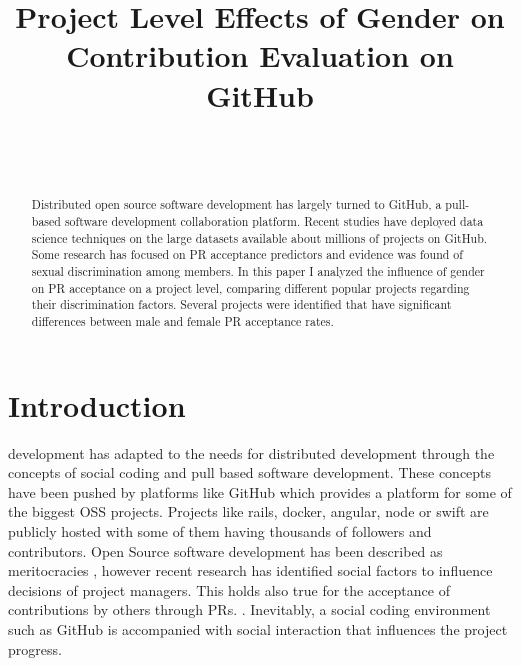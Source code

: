 


\title{Project Level Effects of Gender on Contribution Evaluation on GitHub}

\author{
    \\
    \\
    }

\maketitle

\begin{abstract}%

Distributed open source software development has largely turned to GitHub, a pull-based software development collaboration platform. Recent studies have deployed data science techniques on the large datasets available about millions of projects on GitHub. Some research has focused on \ac{PR} acceptance predictors and evidence was found of sexual discrimination among members. In this paper I analyzed the influence of gender on \ac{PR} acceptance on a project level, comparing different popular projects regarding their discrimination factors. Several projects were identified that have significant differences between male and female \ac{PR} acceptance rates.
\end{abstract}


\section{Introduction}\label{Introduction}

 development has adapted to the needs for distributed development through the concepts of social coding and pull based software development. These concepts have been pushed by platforms like GitHub which provides a platform for some of the biggest \ac{OSS} projects. Projects like rails, docker, angular, node or swift are publicly hosted with some of them having thousands of followers and contributors. Open Source software development has been described as meritocracies \cite{Scacchi:2007:FSS:1295014.1295019}, however recent research has identified social factors to influence decisions of project managers. This holds also true for the acceptance of contributions by others through \ac{PR}s. \cite{Tsay:2014:IST:2568225.2568315}. Inevitably, a social coding environment such as GitHub is accompanied with social interaction that influences the project progress.

